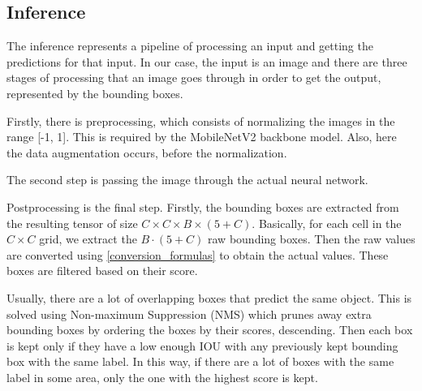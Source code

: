 \subsection{Inference}
    The inference represents a pipeline of processing an input and getting the predictions for that input. In our case, the input is an image and there are three stages of processing that an image goes through in order to get the output, represented by the bounding boxes.

   Firstly, there is preprocessing, which consists of normalizing the images in the range [-1, 1]. This is required by the MobileNetV2 backbone model. Also, here the data augmentation occurs, before the normalization.
   
   The second step is passing the image through the actual neural network.
    
    Postprocessing is the final step. Firstly, the bounding boxes are extracted from the resulting tensor of size $C \times C \times B \times (5+C)$. Basically, for each cell in the $C \times C$ grid, we extract the $B \cdot (5+C)$ raw bounding boxes. Then the raw values are converted using \ref{conversion_formulas} to obtain the actual values. These boxes are filtered based on their score.
    
    Usually, there are a lot of overlapping boxes that predict the same object. This is solved using Non-maximum Suppression (NMS) which prunes away extra bounding boxes by ordering the boxes by their scores, descending. Then each box is kept only if they have a low enough IOU with any previously kept bounding box with the same label. In this way, if there are a lot of boxes with the same label in some area, only the one with the highest score is kept. 
    
